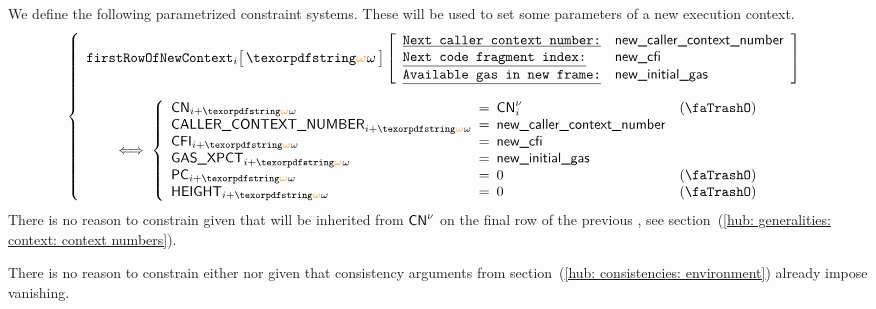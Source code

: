 We define the following parametrized constraint systems. These will be used to set some parameters of a new execution context.
\[
	\left\{ \begin{array}{l}
		\firstRowOfNewContext {i}{\relof}
		\left[ \begin{array}{llr}
			\utt{Next caller context number:} & \col{new\_caller\_context\_number} \\
			\utt{Next code fragment index:}   & \col{new\_cfi}                     \\
			\utt{Available gas in new frame:} & \col{new\_initial\_gas}            \\
		\end{array} \right]
		\vspace{4mm} \\
		\qquad \iff
		\left\{ \begin{array}{lclr}
			\cn            _{i + \relof} & \!\!\! = \!\!\! & \cn\new _{i}                        & (\trash) \\
			\caller        _{i + \relof} & \!\!\! = \!\!\! & \col{new\_caller\_context\_number} \\
			\cfi           _{i + \relof} & \!\!\! = \!\!\! & \col{new\_cfi}                     \\
			\gasExpected   _{i + \relof} & \!\!\! = \!\!\! & \col{new\_initial\_gas}            \\
			\pc            _{i + \relof} & \!\!\! = \!\!\! & 0                                   & (\trash) \\
			\height        _{i + \relof} & \!\!\! = \!\!\! & 0                                   & (\trash) \\
		\end{array} \right.
	\end{array} \right.
\]
\saNote{} There is no reason to constrain \cn{} given that \cn{} will be inherited from $\textsf{CN}^{\nu}$ on the final row of the previous \hubStamp{}, see section~(\ref{hub: generalities: context: context numbers}).

\saNote{} There is no reason to constrain either \pc{} nor \height{} given that consistency arguments from section~(\ref{hub: consistencies: environment}) already impose vanishing.
